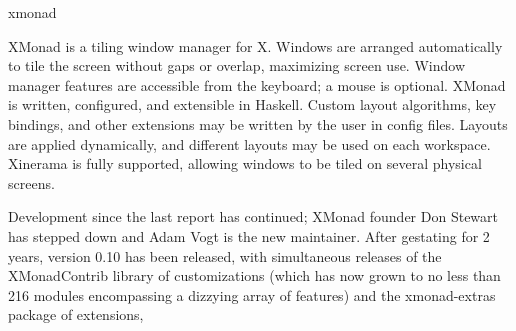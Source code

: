 \begin{hcarentry}{xmonad}
\label{xmonad}
\makeheader

XMonad is a tiling window manager for X. Windows are arranged
automatically to tile the screen without gaps or overlap, maximizing
screen use. Window manager features are accessible from the keyboard; a
mouse is optional. XMonad is written, configured, and extensible in
Haskell. Custom layout algorithms, key bindings, and other extensions may
be written by the user in config files. Layouts are applied
dynamically, and different layouts may be used on each workspace.
Xinerama is fully supported, allowing windows to be tiled on several
physical screens.

Development since the last report has continued; XMonad founder Don Stewart
has stepped down and Adam Vogt is the new maintainer.
After gestating for 2 years, version 0.10 has been released, with simultaneous
releases of the XMonadContrib library of customizations (which has now grown to
no less than 216 modules encompassing a dizzying array of features) and the
xmonad-extras package of extensions,


\end{hcarentry}
